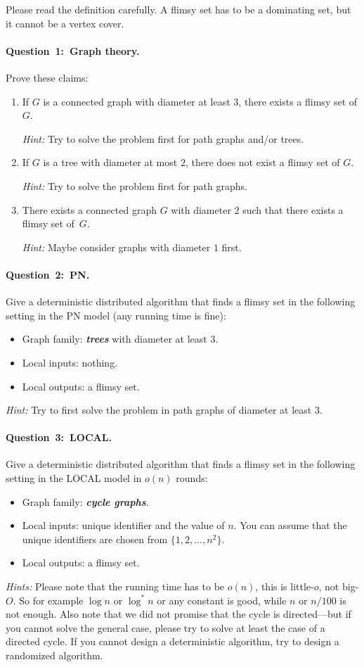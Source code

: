 \documentclass[12pt,a4paper]{article}
\newcommand{\q}[2]{\paragraph{\mbox{Question #1: }#2.}}
\newcommand{\cemph}[1]{\textbf{\emph{\boldmath #1}}}
\begin{document}
Please read the definition carefully. A flimsy set has to be a dominating set, but it cannot be a vertex cover.


\newpage

\q{1}{Graph theory}

Prove these claims:
\begin{enumerate}[label=(\alph*)]
\item If $G$ is a connected graph with diameter at least $3$, there exists a flimsy set of $G$.

    \emph{Hint:} Try to solve the problem first for path graphs and/or trees.
\item If $G$ is a tree with diameter at most $2$, there does not exist a flimsy set of $G$.

    \emph{Hint:} Try to solve the problem first for path graphs.
\item There exists a connected graph $G$ with diameter $2$ such that there exists a flimsy set of~$G$.

    \emph{Hint:} Maybe consider graphs with diameter $1$ first.
\end{enumerate}


\q{2}{PN}

Give a deterministic distributed algorithm that finds a flimsy set in the following setting in the PN model (any running time is fine):
\begin{itemize}
    \item Graph family: \cemph{trees} with diameter at least $3$.
    \item Local inputs: nothing.
    \item Local outputs: a flimsy set.
\end{itemize}
\emph{Hint:} Try to first solve the problem in path graphs of diameter at least $3$.

\q{3}{LOCAL}

Give a deterministic distributed algorithm that finds a flimsy set in the following setting in the LOCAL model in \cemph{$o(n)$} rounds:
\begin{itemize}
    \item Graph family: \cemph{cycle graphs}.
    \item Local inputs: unique identifier and the value of $n$. You can assume that the unique identifiers are chosen from $\{1,2,\dotsc,n^2\}$.
    \item Local outputs: a flimsy set.
\end{itemize}
\emph{Hints:} Please note that the running time has to be $o(n)$, this is little-$o$, not big-$O$. So for example $\log n$ or $\log^* n$ or any constant is good, while $n$ or $n/100$ is not enough. Also note that we did not promise that the cycle is directed---but if you cannot solve the general case, please try to solve at least the case of a directed cycle. If you cannot design a deterministic algorithm, try to design a randomized algorithm.
\end{document}
